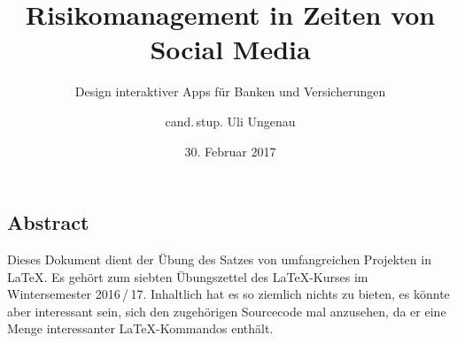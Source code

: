 \documentclass{scrreprt}
\begin{document}
	
\extratitle{\centering Dies ist ein Schmutztitel \\ -- Max Mustermann --}
	
\titlehead{\Large Universität Schlauenheim}
\subject{Masterarbeit}
\title{Risikomanagement in Zeiten von Social Media}
\subtitle{Design interaktiver Apps für Banken und
	Versicherungen}
\author{cand.\,stup. Uli Ungenau}
\date{30. Februar 2017}
\publishers{Betreut durch Prof.\,Dr.\,rer.\,stup. Naseweis}

\maketitle


\subsection*{Abstract}
Dieses Dokument dient der Übung des Satzes von umfangreichen Projekten in \LaTeX{}. Es gehört zum siebten Übungszettel des \LaTeX-Kurses im Wintersemester 2016\,/\,17. Inhaltlich hat es so ziemlich nichts zu bieten, es könnte aber interessant sein, sich den zugehörigen Sourcecode mal anzusehen, da er eine Menge interessanter \LaTeX-Kommandos enthält.


\tableofcontents







\appendix \listoffigures \listoftables
\end{document}
